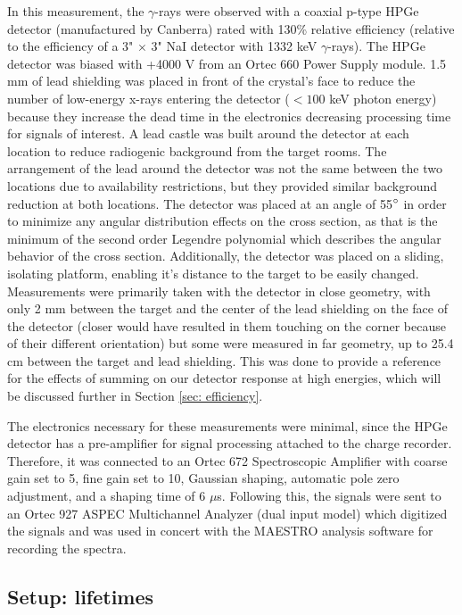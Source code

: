 In this measurement, the $\gamma$-rays were observed with a coaxial p-type HPGe detector (manufactured by Canberra) rated with 130\% relative efficiency (relative to the efficiency of a 3" $\times$ 3" NaI detector with 1332 keV $\gamma$-rays). The HPGe detector was biased with +4000 V from an Ortec 660 Power Supply module. 1.5 mm of lead shielding was placed in front of the crystal's face to reduce the number of low-energy x-rays entering the detector ($<100$ keV photon energy) because they increase the dead time in the electronics decreasing processing time for signals of interest. A lead castle was built around the detector at each location to reduce radiogenic background from the target rooms. The arrangement of the lead around the detector was not the same between the two locations due to availability restrictions, but they provided similar background reduction at both locations.  The detector was placed at an angle of 55$\degree$ in order to minimize any angular distribution effects on the cross section, as that is the minimum of the second order Legendre polynomial which describes the angular behavior of the cross section. Additionally, the detector was placed on a sliding, isolating platform, enabling it's distance to the target to be easily changed. Measurements were primarily taken with the detector in close geometry, with only 2 mm between the target and the center of the lead shielding on the face of the detector (closer would have resulted in them touching on the corner because of their different orientation) but some were measured in far geometry, up to 25.4 cm between the target and lead shielding. This was done to provide a reference for the effects of summing on our detector response at high energies, which will be discussed further in Section \ref{sec: efficiency}. 

The electronics necessary for these measurements were minimal, since the HPGe detector has a pre-amplifier for signal processing attached to the charge recorder. Therefore, it was connected to an Ortec 672 Spectroscopic Amplifier with coarse gain set to 5, fine gain set to 10, Gaussian shaping, automatic pole zero adjustment, and a shaping time of 6 $\mu$s. Following this, the signals were sent to an Ortec 927 ASPEC Multichannel Analyzer (dual input model) which digitized the signals and was used in concert with the MAESTRO analysis software for recording the spectra. 



\subsection{Setup: lifetimes}
\label{sec: lifeMeasurement}


